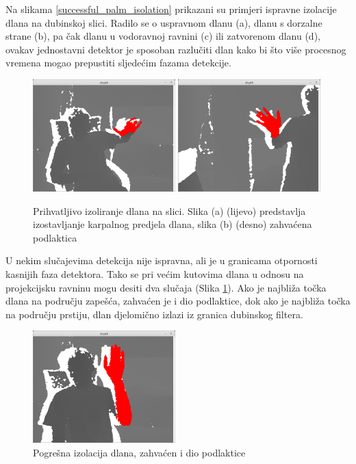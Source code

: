 \documentclass[times, utf8, diplomski, numeric]{fer}
\begin{document}
Na slikama \ref{successful_palm_isolation} prikazani su primjeri ispravne izolacije dlana na dubinskoj slici. Radilo se o uspravnom dlanu (a), dlanu s dorzalne strane (b), pa čak dlanu u vodoravnoj ravnini (c) ili zatvorenom dlanu (d), ovakav jednostavni detektor je sposoban razlučiti dlan kako bi što više procesnog vremena mogao prepustiti sljedećim fazama detekcije.
\begin{figure}[h!]
\centering
\includegraphics[width = 0.49\textwidth]{detekcija/izolacija-zadovoljavajuce-1}
\includegraphics[width = 0.49\textwidth]{detekcija/izolacija-zadovoljavajuce-2}
\caption{Prihvatljivo izoliranje dlana na slici. 
Slika (a) (lijevo) predstavlja izostavljanje karpalnog predjela dlana, 
slika (b) (desno) zahvaćena podlaktica} \label{satisfactorily_palm_isolation}
\end{figure}

U nekim slučajevima detekcija nije ispravna, ali je u granicama otpornosti kasnijih faza detektora. Tako se pri većim kutovima dlana u odnosu na projekcijsku ravninu mogu desiti dva slučaja (Slika \ref{satisfactorily_palm_isolation}). Ako je najbliža točka dlana na području zapešća, zahvaćen je i dio podlaktice, dok ako je najbliža točka na području prstiju, dlan djelomično izlazi iz granica dubinskog filtera.

\begin{figure}[h!]
\centering
\includegraphics[width = 0.49\textwidth]{detekcija/izolacija-krivo-1}
\caption{Pogrešna izolacija dlana, zahvaćen i dio podlaktice} \label{poor_palm_isolation}
\end{figure}
\end{document}
